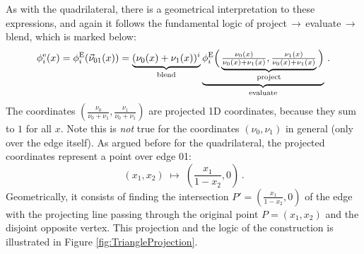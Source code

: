 As with the quadrilateral, there is a geometrical interpretation to these expressions, and again it follows the fundamental logic of project$\,\to\,$evaluate$\,\to\,$blend, which is marked below:
\begin{equation*}
    \phi_i^\mathrm{e}(x)=\phi_i^{\mathrm{E}}(\vec{\nu}_{01}(x))
    	=\underbrace{(\nu_0(x)+\nu_1(x))^i}_{\text{blend}}
    		\underbrace{\phi_i^{\mathrm{E}}\Big(\underbrace{\textstyle{\frac{\nu_0(x)}{\nu_0(x)+\nu_1(x)}},
    			\textstyle{\frac{\nu_1(x)}{\nu_0(x)+\nu_1(x)}}}_{\text{project}}\Big)}_{\text{evaluate}}\,.
\end{equation*}
The coordinates $(\frac{\nu_0}{\nu_0+\nu_1},\frac{\nu_1}{\nu_0+\nu_1})$ are projected 1D coordinates, because they sum to $1$ for all $x$. 
Note this is \textit{not} true for the coordinates $(\nu_0,\nu_1)$ in general (only over the edge itself).
As argued before for the quadrilateral, the projected coordinates represent a point over edge 01:
\begin{equation*}
	(x_1,x_2)\;\longmapsto\;(\textstyle{\frac{x_1}{1-x_2}},0)\,.
\end{equation*}
Geometrically, it consists of finding the intersection $P'=(\frac{x_1}{1-x_2},0)$ of the edge with the projecting line passing through the original point $P=(x_1,x_2)$ and the disjoint opposite vertex. 
This projection and the logic of the construction is illustrated in Figure \ref{fig:TriangleProjection}.


